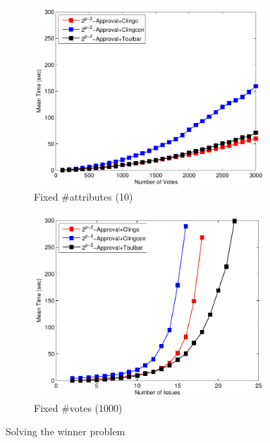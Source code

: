 {
	\begin{figure}
		\centering
    \begin{subfigure}[b]{0.45\textwidth}
			\centering
			\includegraphics[width=0.95\textwidth]{figs/LPTrees/win/expAppFISCICP.pdf}
			\caption{Fixed \#attributes (10)}
		\end{subfigure}
    \begin{subfigure}[b]{0.45\textwidth}
			\centering
			\includegraphics[width=0.95\textwidth]{figs/LPTrees/win/expAppFVSCICP.pdf}
			\caption{Fixed \#votes (1000)}
		\end{subfigure}

		\caption{Solving the winner problem}
	\end{figure}
}

